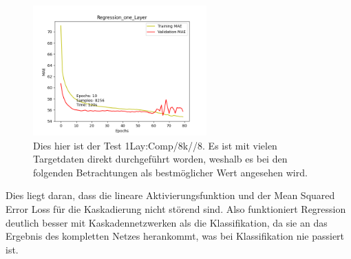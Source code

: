 \begin{figure}[htpb]
    \centering
    \includegraphics[height=5cm]{../../Plots/ba_plots/regression_large/onelayer_complete.png}
    \caption{\label{fig:largeregr2comp} 
    \small{Dies hier ist der Test 1Lay:Comp/8k//8. Es ist mit vielen Targetdaten direkt durchgeführt worden, weshalb es bei den folgenden 
    Betrachtungen als bestmöglicher Wert angesehen wird.}}
\end{figure}

Dies liegt daran, dass die lineare Aktivierungsfunktion und der Mean Squared Error Loss für die Kaskadierung nicht störend sind. 
Also funktioniert Regression deutlich besser mit Kaskadennetzwerken als die Klassifikation, da sie an das Ergebnis des kompletten Netzes 
herankommt, was bei Klassifikation nie passiert ist. 
